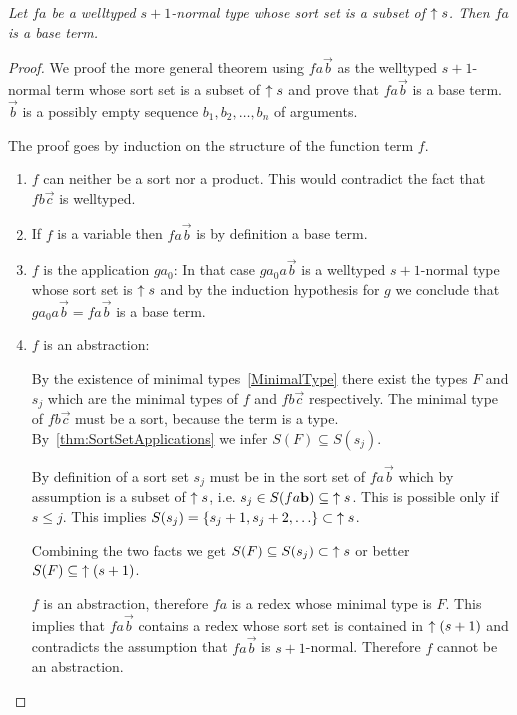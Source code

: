 \begin{theorem}
    \label{thm:NormalBaseTerm}
    \emph{Let $fa$ be a welltyped $s+1$-normal type whose sort set is a subset
    of ${\uparrow s}$.  Then $fa$ is a base term.}

    \begin{proof}
        We proof the more general theorem using $f a \vec b$ as the welltyped
        $s+1$-normal term whose sort set is a subset of  ${\uparrow s}$ and prove
        that $f a \vec b$ is a base term. $\vec b$ is a possibly empty sequence
        $b_1, b_2, \ldots, b_n$ of arguments.

        The proof goes by induction on the structure of the function term $f$.
        \begin{enumerate}

            \item $f$ can neither be a sort nor a product. This would contradict
                the fact that $f b \vec c$ is welltyped.

            \item If $f$ is a variable then $f a \vec b$ is by definition a base
                term.

            \item $f$ is the application $ga_0$: In that case $ga_0 a \vec b$ is
                a welltyped $s+1$-normal type whose sort set is ${\uparrow s}$
                and by the induction hypothesis for $g$ we conclude that $g a_0
                a \vec b = f a \vec b$ is a base term.

            \item $f$ is an abstraction:

                By the existence of minimal types~\ref{MinimalType} there exist
                the types $F$ and $s_j$ which are the minimal types of $f$
                and $f b \vec c$ respectively. The minimal type of $f b \vec c$
                must be a sort, because the term is a type.
                By~\ref{thm:SortSetApplications} we infer $S(F) \subseteq
                S(s_j)$.

                By definition of a sort set $s_j$ must be in the sort set of
                $f a \vec b$ which by assumption is a subset of ${\uparrow s}$, i.e.
                $ s_j \in S(f a {\mathbf b}) \subseteq {\uparrow s}$.
                This is possible only if $s \le j$. This implies $S(s_j) =
                {\left\{s_j + 1, s_j + 2, \ldots\right\}}
                \subset {\uparrow s}$.

                Combining the two facts we get $S(F) \subseteq S(s_j) \subset
                {\uparrow s}$ or better $S(F) \subseteq {\uparrow (s + 1)}$.

                $f$ is an abstraction, therefore $f a$ is a redex whose minimal
                type is $F$. This implies that $f a \vec b$ contains a redex
                whose sort set is contained in ${\uparrow (s + 1)}$ and
                contradicts the assumption that $f a \vec b$ is $s+1$-normal.
                Therefore $f$ cannot be an abstraction.
        \end{enumerate}
    \end{proof}
\end{theorem}

